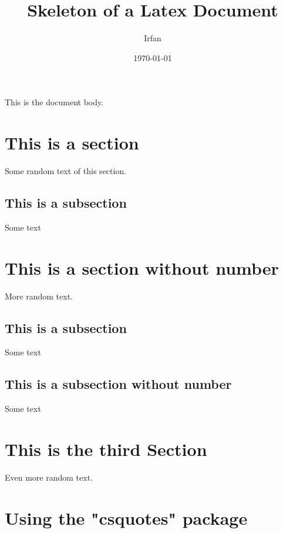 \documentclass{article}
\title{Skeleton of a Latex Document}
\author{Irfan}
\date{\today}
\begin{document}
\maketitle

\tableofcontents

This is the document body.

\begin{comment}
  Everything inside this block
  will be treated as comments and won't be rendered.
\end{comment}

\section{This is a section}
Some random text of this section.

\subsection{This is a subsection}
Some text

\section*{This is a section without number}
More random text.

\subsection{This is a subsection}
Some text
\subsection*{This is a subsection without number}
Some text

\section{This is the third Section}
Even more random text.

\section{Using the "csquotes" package}
\end{document}
